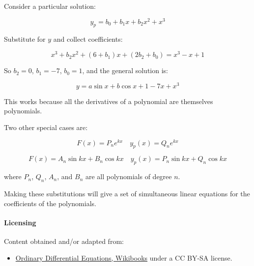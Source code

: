 Consider a particular solution:

$$y_p = b_0 + b_1 x + b_2 x^2 + x^3$$

Substitute for $y$ and collect coefficients:

$$x^3 + b_2 x^2 + (6 + b_1)x + (2b_2 + b_0) = x^3 - x + 1$$

So $b_2 = 0$, $b_1 = -7$, $b_0 = 1$, and the general solution is:

$$y = a \sin x + b \cos x + 1 - 7x + x^3$$



This works because all the derivatives of a polynomial are themselves polynomials.



Two other special cases are:

$$F(x) = P_n e^{kx} \quad y_p(x) = Q_n e^{kx}$$

$$F(x) = A_n \sin kx + B_n \cos kx \quad y_p(x) = P_n \sin kx + Q_n \cos kx$$

where $P_n$, $Q_n$, $A_n$, and $B_n$ are all polynomials of degree $n$.



Making these substitutions will give a set of simultaneous linear equations for the coefficients of the polynomials.



\paragraph{Licensing}

Content obtained and/or adapted from:

\begin{itemize}
    \item \href{https://en.wikibooks.org/wiki/Calculus/Ordinary_differential_equations}{Ordinary Differential Equations, Wikibooks} under a CC BY-SA license.
\end{itemize}
